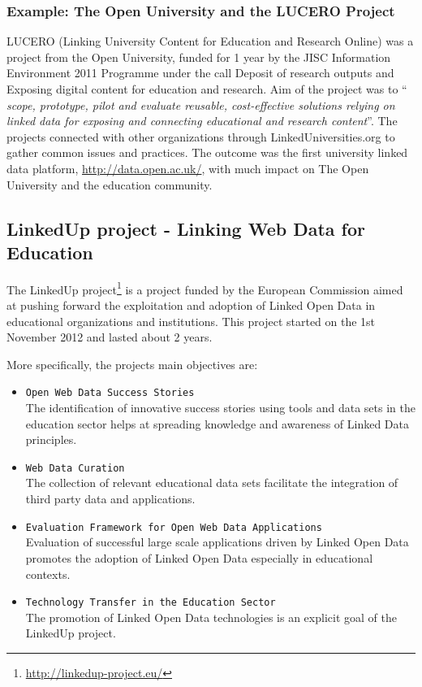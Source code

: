 \documentclass{article}
\begin{document}
\subsubsection{Example: The Open University and the LUCERO Project}
LUCERO (Linking University Content for Education and Research Online) was a project from the Open University, funded for 1 year by the JISC Information Environment 2011 Programme under the call Deposit of research outputs and Exposing digital content for education and research. Aim of the project was to "` \textit{ scope, prototype, pilot and evaluate reusable, cost-effective solutions relying on linked data for exposing and connecting educational and research content}"'.\cite{daquin_lucero_2010} The projects connected with other organizations through LinkedUniversities.org to gather common issues and practices. The outcome was the first university linked data platform, \url{http://data.open.ac.uk/}, with much impact on The Open University and the education community.

\subsection{LinkedUp project - Linking Web Data for Education}
\label{related-work:linkedup}
The LinkedUp project\footnote{\url{http://linkedup-project.eu/}} is a project funded by the European Commission aimed at pushing forward the exploitation and adoption of Linked Open Data in educational organizations and institutions. This project started on the 1st November 2012 and lasted about 2 years. 

More specifically, the projects main objectives are:
\begin{itemize}
	\item \texttt{Open Web Data Success Stories}~\\
	The identification of innovative success stories using tools and data sets in the education sector helps at spreading knowledge and awareness of Linked Data 
	principles. 
	\item \texttt{Web Data Curation}~\\
	The collection of relevant educational data sets facilitate the integration of third party data and applications. 
	\item \texttt{Evaluation Framework for Open Web Data Applications}~\\
	Evaluation of successful large scale applications driven by Linked Open Data promotes the adoption of Linked Open Data especially in educational contexts. 
	\item \texttt{Technology Transfer in the Education Sector}~\\
	The promotion of Linked Open Data technologies is an explicit goal of the LinkedUp project. 
\end{itemize}
\end{document}
